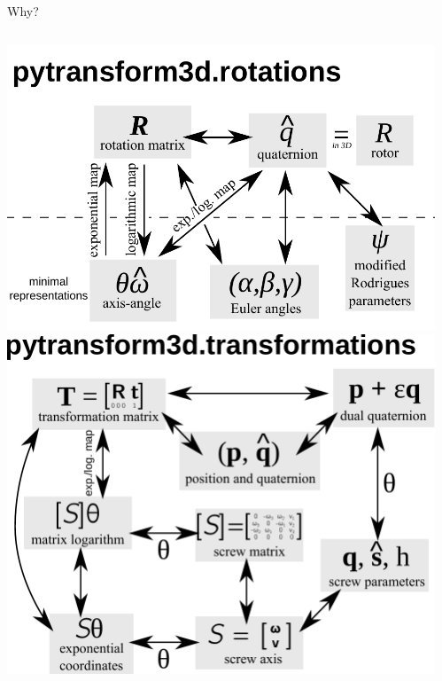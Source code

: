 \documentclass[14pt,aspectratio=169]{beamer}
\begin{document}
\begin{frame}{Why?}
\pause
\begin{columns}
\begin{column}{0.35\textwidth}
\includegraphics[width=\textwidth]{images/rotations}
\includegraphics[width=\textwidth]{images/transformations}
\end{column}
\begin{column}{0.6\textwidth}
\pause

\end{column}
\end{columns}
\end{frame}
\end{document}
